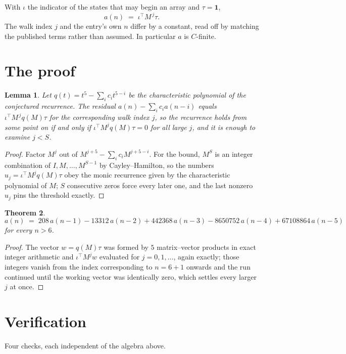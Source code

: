 \documentclass[11pt,a4paper]{article}
\theoremstyle{plain}
\newtheorem{theorem}{Theorem}
\newtheorem{lemma}[theorem]{Lemma}
\theoremstyle{definition}
\begin{document}
With $\iota$ the indicator of the states that may begin an array and $\tau=\mathbf{1}$,
\[
a(n)\;=\;\iota^{\!\top}M^{\,j}\tau .
\]
The walk index $j$ and the entry's own $n$ differ by a constant, read off by matching the
published terms rather than assumed. In particular $a$ is $C$-finite.

\section{The proof}

\begin{lemma}\label{lem:crit}
Let $q(t)=t^{5}-\sum_i c_it^{5-i}$ be the characteristic polynomial of the
conjectured recurrence. The residual $a(n)-\sum_ic_ia(n-i)$ equals
$\iota^{\!\top}M^{\,j}q(M)\tau$ for the corresponding walk index $j$, so the recurrence
holds from some point on if and only if $\iota^{\!\top}M^{j}q(M)\tau=0$ for all large $j$,
and it is enough to examine $j<S$.
\end{lemma}

\begin{proof}
Factor $M^{j}$ out of $M^{j+5}-\sum_ic_iM^{j+5-i}$. For the bound, $M^{S}$
is an integer combination of $I,M,\dots,M^{S-1}$ by Cayley--Hamilton, so the numbers
$u_j=\iota^{\!\top}M^{j}q(M)\tau$ obey the monic recurrence given by the characteristic
polynomial of $M$; $S$ consecutive zeros force every later one, and the last nonzero $u_j$
pins the threshold exactly.
\end{proof}

\begin{theorem}
\[
a(n)\;=\;208\,a(n-1) - 13312\,a(n-2) + 442368\,a(n-3) - 8650752\,a(n-4) + 67108864\,a(n-5)
\]
for every $n>6$.
\end{theorem}

\begin{proof}
The vector $w=q(M)\tau$ was formed by $5$ matrix--vector products in exact integer
arithmetic and $\iota^{\!\top}M^{j}w$ evaluated for $j=0,1,\dots$, again exactly; those
integers vanish from the index corresponding to $n=6+1$ onwards and the run continued
until the working vector was identically zero, which settles every larger $j$ at once.
\end{proof}

\section{Verification}

Four checks, each independent of the algebra above.
\end{document}

